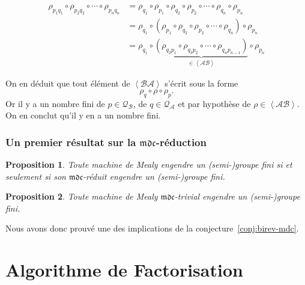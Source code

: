 \documentclass[11pt]{beamer}
\newtheorem{prop}{Proposition}
\begin{document}
\begin{frame}
  \begin{align*}
    \rho_{p_1q_1}\circ\rho_{p_2q_2}\circ\cdots\circ\rho_{p_nq_n} &= \rho_{q_1}\circ\rho_{p_1}\circ\rho_{q_2}\circ\rho_{p_2}\circ\cdots\circ\rho_{q_n}\circ\rho_{p_n} \\
    &=\rho_{q_1}\circ\left(\rho_{p_1}\circ\rho_{q_2}\circ\rho_{p_2}\circ\cdots\circ\rho_{q_n}\right)\circ\rho_{p_n} \\
    &=\rho_{q_1}\circ\underbrace{\left(\rho_{q_2p_1}\circ\rho_{q_3p_2}\circ\cdots\circ\rho_{q_np_{n-1}}\right)}_{\in\left<\mathcal{A}\mathcal{B}\right>}\circ\rho_{p_n}
  \end{align*}

  On en déduit que tout élément de $\left<\mathcal{B}\mathcal{A}\right>$ s'écrit sous la forme
  \[ \rho_q\circ\rho\circ\rho_p. \] Or il y a un nombre fini de $p\in\mathcal{Q}_\mathcal{B}$, de $q\in\mathcal{Q}_\mathcal{A}$ et par hypothèse de $\rho\in\left<\mathcal{AB}\right>$. On en conclut qu'il y en a un nombre fini.

\end{frame}

\begin{frame}
  \frametitle{Un premier résultat sur la $\mathfrak{mdc}$-réduction}
  \begin{prop}
    Toute machine de Mealy engendre un (semi-)groupe fini si et seulement si son $\mathfrak{mdc}$-réduit engendre un (semi-)groupe fini.
  \end{prop}

  \begin{prop}
    Toute machine de Mealy $\mathfrak{mdc}$-trivial engendre un (semi-)groupe fini.
  \end{prop}

  Nous avons donc prouvé une des implications de la conjecture~\ref{conj:birev-mdc}.
\end{frame}

\section{Algorithme de Factorisation}
\end{document}
